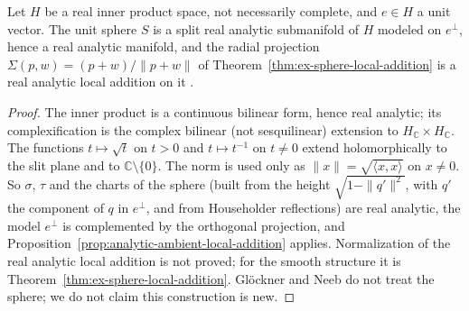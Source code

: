 \begin{theorem}
  \label{thm:ex-sphere-analytic}
  \leanok
  Let $H$ be a real inner product space, not necessarily complete, and $e \in H$ a unit vector.
  The unit sphere $S$ is a split real analytic submanifold of $H$ modeled on $e^\perp$, hence a
  real analytic manifold, and the radial projection $\Sigma(p, w) = (p + w)/\|p + w\|$ of
  Theorem~\ref{thm:ex-sphere-local-addition} is a real analytic local addition on it
  \cite[p.~325]{GN26}.
\end{theorem}

\begin{proof}
  \leanok
  The inner product is a continuous bilinear form, hence real analytic; its complexification is
  the complex bilinear (not sesquilinear) extension to $H_{\mathbb{C}} \times H_{\mathbb{C}}$. The
  functions $t \mapsto \sqrt t$ on $t > 0$ and $t \mapsto t^{-1}$ on $t \neq 0$ extend
  holomorphically to the slit plane and to $\mathbb{C} \setminus \{0\}$. The norm is used only as
  $\|x\| = \sqrt{\langle x, x\rangle}$ on $x \neq 0$. So $\sigma$, $\tau$ and the charts of the
  sphere (built from the height $\sqrt{1 - \|q'\|^2}$, with $q'$ the component of $q$ in $e^\perp$, and from Householder reflections) are real
  analytic, the model $e^\perp$ is complemented by the orthogonal projection, and
  Proposition~\ref{prop:analytic-ambient-local-addition} applies. Normalization of the real
  analytic local addition is not proved; for the smooth structure it is
  Theorem~\ref{thm:ex-sphere-local-addition}. Glöckner and Neeb do not treat the sphere; we do not
  claim this construction is new.
\end{proof}

